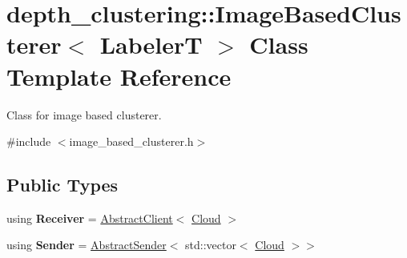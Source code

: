 \hypertarget{classdepth__clustering_1_1ImageBasedClusterer}{\section{depth\-\_\-clustering\-:\-:Image\-Based\-Clusterer$<$ Labeler\-T $>$ Class Template Reference}
\label{classdepth__clustering_1_1ImageBasedClusterer}
}


Class for image based clusterer.  




{\ttfamily \#include $<$image\-\_\-based\-\_\-clusterer.\-h$>$}

\subsection*{Public Types}
\begin{DoxyCompactItemize}
\item 
\hypertarget{classdepth__clustering_1_1ImageBasedClusterer_a62774a9ad3f50dd9811c2194c99eff7f}{using {\bfseries Receiver} = \hyperlink{classdepth__clustering_1_1AbstractClient}{Abstract\-Client}$<$ \hyperlink{classdepth__clustering_1_1Cloud}{Cloud} $>$}\label{classdepth__clustering_1_1ImageBasedClusterer_a62774a9ad3f50dd9811c2194c99eff7f}

\item 
\hypertarget{classdepth__clustering_1_1ImageBasedClusterer_a639353b7fb8f37636bf38aa371c2a7ec}{using {\bfseries Sender} = \hyperlink{classdepth__clustering_1_1AbstractSender}{Abstract\-Sender}$<$ std\-::vector$<$ \hyperlink{classdepth__clustering_1_1Cloud}{Cloud} $>$$>$}\label{classdepth__clustering_1_1ImageBasedClusterer_a639353b7fb8f37636bf38aa371c2a7ec}

\end{DoxyCompactItemize}

